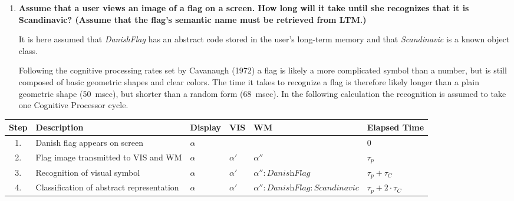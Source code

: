 \begin{enumerate}[label=\alph*)]
\item \textbf{Assume that a user views an image of a flag on a screen. How long will it take until she recognizes that it is Scandinavic? (Assume that the flag's semantic name must be retrieved from \ac{LTM}.)}

It is here assumed that \textit{DanishFlag} has an abstract code stored in the user's long-term memory and that \textit{Scandinavic} is a known object class.

Following the cognitive processing rates set by Cavanaugh (1972) a flag is likely a more complicated symbol than a number, but is still composed of basic geometric shapes and clear colors. The time it takes to recognize a flag is therefore likely longer than a plain geometric shape (50~msec), but shorter than a random form (68~msec). In the following calculation the recognition is assumed to take one Cognitive Processor cycle.

\end{enumerate}

{\footnotesize
\begin{tabular}{clllll}
Step & Description & Display & VIS & WM & Elapsed Time \\
\hline
1. & Danish flag appears on screen & $\alpha$ & & & 0 \\
2. & Flag image transmitted to VIS and WM & $\alpha$ & $\alpha'$ & $\alpha''$ & $\tau_p$ \\
3. & Recognition of visual symbol & $\alpha$ & $\alpha'$ & $\alpha'':\textit{DanishFlag}$ & $\tau_p + \tau_C$ \\
4. & Classification of abstract representation & $\alpha$ & $\alpha'$ & $\alpha'':\textit{DanishFlag}:\textit{Scandinavic}$ & $\tau_p + 2 \cdot \tau_C$ \\
\end{tabular}
}

